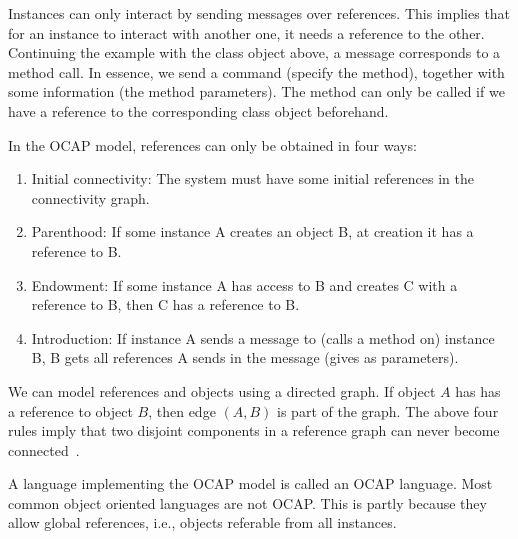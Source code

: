 Instances can only interact by sending messages over references. This implies
that for an instance to interact with another one, it needs a reference to the
other. Continuing the example with the class object above, a message corresponds
to a method call. In essence, we send a command (specify the method), together
with some information (the method parameters). The method can only be called if
we have a reference to the corresponding class object beforehand.

In the OCAP model, references can only be obtained in four ways:
\begin{enumerate}
  \item Initial connectivity: The system must have some initial references in
    the connectivity graph.
  \item Parenthood: If some instance A creates an object B, at creation it has
    a reference to B.
  \item Endowment: If some instance A has access to B and creates C with a
    reference to B, then C has a reference to B.
  \item Introduction: If instance A sends a message to (calls a method on)
    instance B, B gets all references A sends in the message (gives as
    parameters).
\end{enumerate}
We can model references and objects using a directed graph. If object $A$ has
has a reference to object $B$, then edge $(A, B)$ is part of the graph. The
above four rules imply that two disjoint components in a reference graph can
never become connected~\parencite{Miller06b}.

A language implementing the OCAP model is called an OCAP language. Most common
object oriented languages are not OCAP. This is partly because they allow global
references, i.e., objects referable from all instances.
